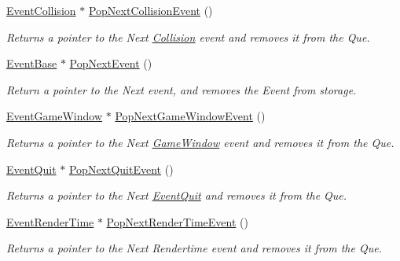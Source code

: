 \begin{DoxyCompactItemize}
\hyperlink{classMezzanine_1_1EventCollision}{EventCollision} $\ast$ \hyperlink{classMezzanine_1_1EventManager_a25b42c9f5a4ac2910d5e0d79b2bd2c17}{PopNextCollisionEvent} ()
\begin{DoxyCompactList}\small\item\em Returns a pointer to the Next \hyperlink{classMezzanine_1_1Collision}{Collision} event and removes it from the Que. \item\end{DoxyCompactList}\item 
\hyperlink{classMezzanine_1_1EventBase}{EventBase} $\ast$ \hyperlink{classMezzanine_1_1EventManager_a48861de138f2c59480527cf16518444a}{PopNextEvent} ()
\begin{DoxyCompactList}\small\item\em Return a pointer to the Next event, and removes the Event from storage. \item\end{DoxyCompactList}\item 
\hyperlink{classMezzanine_1_1EventGameWindow}{EventGameWindow} $\ast$ \hyperlink{classMezzanine_1_1EventManager_a91f8be3fedf91ba5a32825a8dd97de95}{PopNextGameWindowEvent} ()
\begin{DoxyCompactList}\small\item\em Returns a pointer to the Next \hyperlink{classMezzanine_1_1GameWindow}{GameWindow} event and removes it from the Que. \item\end{DoxyCompactList}\item 
\hyperlink{classMezzanine_1_1EventQuit}{EventQuit} $\ast$ \hyperlink{classMezzanine_1_1EventManager_aa7cefb4728acb84517e2891adc450c27}{PopNextQuitEvent} ()
\begin{DoxyCompactList}\small\item\em Returns a pointer to the Next \hyperlink{classMezzanine_1_1EventQuit}{EventQuit} and removes it from the Que. \item\end{DoxyCompactList}\item 
\hyperlink{classMezzanine_1_1EventRenderTime}{EventRenderTime} $\ast$ \hyperlink{classMezzanine_1_1EventManager_aedbb7374cf4c97a5f5ab5283627da83f}{PopNextRenderTimeEvent} ()
\begin{DoxyCompactList}\small\item\em Returns a pointer to the Next Rendertime event and removes it from the Que. \item\end{DoxyCompactList}\item 

\end{DoxyCompactItemize}
